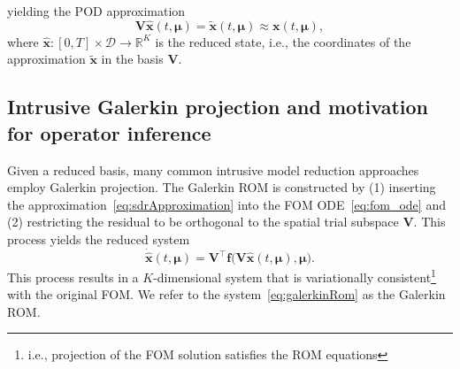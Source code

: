 \documentclass[3p,computermodern,11pt]{elsarticle}
\numberwithin{equation}{section}
\newcommand{\reducedState}{\hat{\state}}
\newcommand{\reducedStateDot}{\dot{\hat{\state}}}
\newcommand{\state}{\boldsymbol x}
\newcommand{\approxState}{\tilde{\state}}
\newcommand{\refState}{\state_{\text{ref}}}
\newcommand{\romBasis}{\mathbf{V}}
\newcommand{\velocity}{\boldsymbol f}
\newcommand{\params}{\boldsymbol \mu}
\newcommand{\paramDomain}{\mathcal{D}}
\newcommand{\timeDomain}{[0,T]}
\newcommand{\RR}[1]{\mathbb{R}^{#1}}
\newcommand{\romDim}{K}
\begin{document}
yielding the POD approximation
\begin{equation}\label{eq:sdrApproximation}
\romBasis \reducedState(t,\params) = \approxState(t,\params) \approx \state(t,\params),
\end{equation}
where $\reducedState : \timeDomain \times \paramDomain \rightarrow \RR{\romDim}$ is the reduced state, i.e., the coordinates of the approximation $\approxState$ in the basis $\romBasis$.

\subsection{Intrusive Galerkin projection and motivation for operator inference}
Given a reduced basis, many common intrusive model reduction approaches employ Galerkin projection. The Galerkin ROM is constructed by (1) inserting the approximation~\eqref{eq:sdrApproximation} into the FOM ODE~\eqref{eq:fom_ode} and (2) restricting the residual to be orthogonal to the spatial trial subspace $\romBasis$. This process yields the reduced system
\begin{equation}\label{eq:galerkinRom}
\reducedStateDot(t,\params) = \romBasis^\intercal \velocity\big(\romBasis \reducedState(t,\params),\params\big). 
\end{equation}
This process results in a $\romDim$-dimensional system that is variationally consistent\footnote{i.e., projection of the FOM solution satisfies the ROM equations} with the original FOM. We refer to the system~\eqref{eq:galerkinRom} as the Galerkin ROM.
\end{document}
